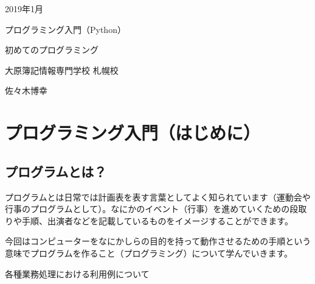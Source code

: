 \documentclass[11pt,a4paper,dvipdfmx,titlepage]{jsreport}
\begin{document}
\begin{center}
  \huge 2019年1月　\par
  \vspace{15mm}
  \huge プログラミング入門（Python） \par
  \vspace{15mm}
  \LARGE  初めてのプログラミング　\par
  \vspace{100mm}
\end{center}
 
\begin{flushright}
 \Large 大原簿記情報専門学校 札幌校 \par
  \vspace{15mm}
  \Large 佐々木博幸 \par
  \vspace{10mm}
\end{flushright}
\thispagestyle{empty}
\clearpage
\addtocounter{page}{-1}
\newpage

\tableofcontents
\printindex
\chapter{プログラミング入門（はじめに）}

\section{プログラムとは？}
プログラムとは日常では計画表を表す言葉としてよく知られています（運動会や行事のプログラムとして）。なにかのイベント（行事）を進めていくための段取りや手順、出演者などを記載しているものをイメージすることができます。



今回はコンピューターをなにかしらの目的を持って動作させるための手順という意味でプログラムを作ること（プログラミング）について学んでいきます。


各種業務処理における利用例について
\end{document}
